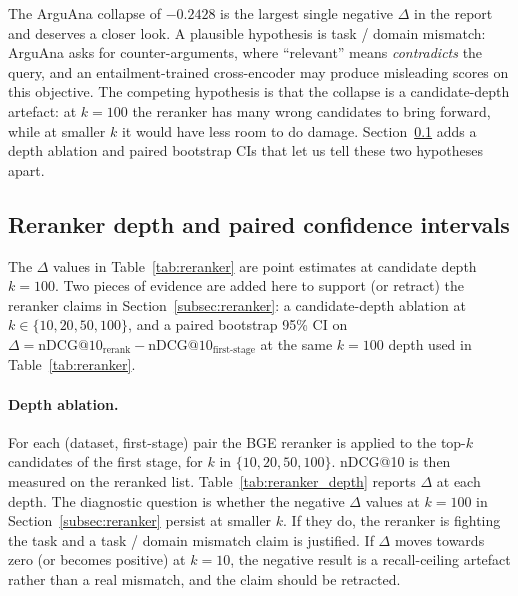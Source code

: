 \documentclass[11pt,a4paper]{article}
\begin{document}
The ArguAna collapse of $-0.2428$ is the largest single negative
$\Delta$ in the report and deserves a closer look. A plausible
hypothesis is task / domain mismatch: ArguAna asks for
counter-arguments, where ``relevant'' means \emph{contradicts} the
query, and an entailment-trained cross-encoder may produce misleading
scores on this objective. The competing hypothesis is that the
collapse is a candidate-depth artefact: at $k=100$ the reranker has
many wrong candidates to bring forward, while at smaller $k$ it would
have less room to do damage. Section~\ref{subsec:reranker_depth_ci}
adds a depth ablation and paired bootstrap CIs that let us tell these
two hypotheses apart.

\subsection{Reranker depth and paired confidence intervals}
\label{subsec:reranker_depth_ci}

The $\Delta$ values in Table~\ref{tab:reranker} are point estimates at
candidate depth $k = 100$. Two pieces of evidence are added here to
support (or retract) the reranker claims in
Section~\ref{subsec:reranker}: a candidate-depth ablation at
$k \in \{10, 20, 50, 100\}$, and a paired bootstrap 95\% CI on
$\Delta = \text{nDCG@10}_{\text{rerank}} - \text{nDCG@10}_{\text{first-stage}}$
at the same $k=100$ depth used in Table~\ref{tab:reranker}.

\paragraph{Depth ablation.}
For each (dataset, first-stage) pair the BGE reranker is applied to
the top-$k$ candidates of the first stage, for $k$ in
$\{10, 20, 50, 100\}$. nDCG@10 is then measured on the reranked
list. Table~\ref{tab:reranker_depth} reports $\Delta$ at each depth.
The diagnostic question is whether the negative $\Delta$ values at
$k=100$ in Section~\ref{subsec:reranker} persist at smaller $k$. If
they do, the reranker is fighting the task and a task / domain
mismatch claim is justified. If $\Delta$ moves towards zero (or
becomes positive) at $k=10$, the negative result is a recall-ceiling
artefact rather than a real mismatch, and the claim should be
retracted.

\begin{table}[ht]
    \centering
    \caption{Candidate-depth ablation for the BGE-reranker-base over
    the six (dataset, first-stage) pairs of Section~\ref{subsec:reranker}.
    Cells show $\Delta$ nDCG@10. Empty cells require the Colab rerun
    in \texttt{phase\_b.rerank\_depth\_and\_ci}; the $k=100$ column is
    the same value as in Table~\ref{tab:reranker}.}
    \label{tab:reranker_depth}
    \small
    
\end{table}
\end{document}
